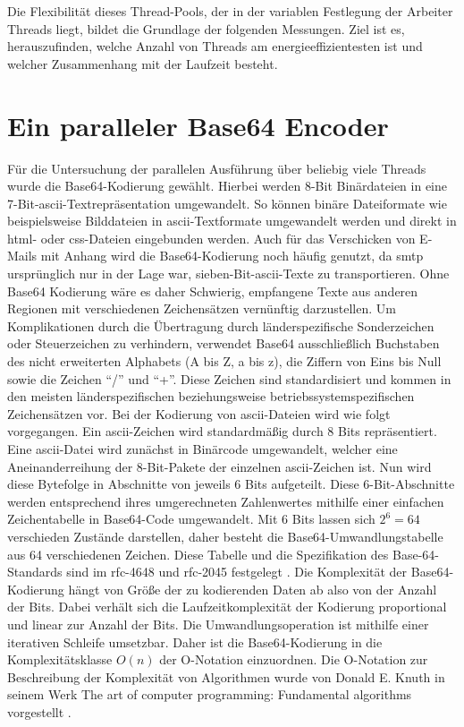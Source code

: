 Die Flexibilität dieses Thread-Pools, der in der variablen Festlegung der Arbeiter Threads liegt, bildet die Grundlage der folgenden Messungen. Ziel ist es, herauszufinden, welche Anzahl von Threads am energieeffizientesten ist und welcher Zusammenhang mit der Laufzeit besteht.

\section{Ein paralleler Base64 Encoder}

Für die Untersuchung der parallelen Ausführung über beliebig viele Threads wurde die Base64-Kodierung gewählt. Hierbei werden 8-Bit Binärdateien in eine 7-Bit-\ac{ascii}-Textrepräsentation umgewandelt. So können binäre Dateiformate wie beispielsweise Bilddateien in \ac{ascii}-Textformate umgewandelt werden und direkt in \ac{html}- oder \ac{css}-Dateien eingebunden werden. Auch für das Verschicken von E-Mails mit Anhang wird die Base64-Kodierung noch häufig genutzt, da \ac{smtp} ursprünglich nur in der Lage war, sieben-Bit-\ac{ascii}-Texte zu transportieren. Ohne Base64 Kodierung wäre es daher Schwierig, empfangene Texte aus anderen Regionen mit verschiedenen Zeichensätzen vernünftig darzustellen. Um Komplikationen durch die Übertragung durch länderspezifische Sonderzeichen oder Steuerzeichen zu verhindern, verwendet Base64 ausschließlich Buchstaben des nicht erweiterten Alphabets (A bis Z, a bis z), die Ziffern von Eins bis Null sowie die Zeichen \enquote{/} und \enquote{+}. Diese Zeichen sind standardisiert und kommen in den meisten länderspezifischen beziehungsweise betriebssystemspezifischen Zeichensätzen vor. Bei der Kodierung von \ac{ascii}-Dateien wird wie folgt vorgegangen. Ein \ac{ascii}-Zeichen wird standardmäßig durch 8 Bits repräsentiert. Eine \ac{ascii}-Datei wird zunächst in Binärcode umgewandelt, welcher eine Aneinanderreihung der 8-Bit-Pakete der einzelnen \ac{ascii}-Zeichen ist. Nun wird diese Bytefolge in Abschnitte von jeweils 6 Bits aufgeteilt. Diese 6-Bit-Abschnitte werden entsprechend ihres umgerechneten Zahlenwertes mithilfe einer einfachen Zeichentabelle in Base64-Code umgewandelt. Mit 6 Bits lassen sich $2^{ 6 } = 64$ verschieden Zustände darstellen, daher besteht die Base64-Umwandlungstabelle aus 64 verschiedenen Zeichen. Diese Tabelle und die Spezifikation des Base-64-Standards sind im \ac{rfc}-4648 \cite{base64-rfc4648} und \ac{rfc}-2045 festgelegt \cite{base64-rfc2045}. Die Komplexität der Base64-Kodierung hängt von Größe der zu kodierenden Daten ab also von der Anzahl der Bits. Dabei verhält sich die Laufzeitkomplexität der Kodierung proportional und linear zur Anzahl der Bits. Die Umwandlungsoperation ist mithilfe einer iterativen Schleife umsetzbar. Daher ist die Base64-Kodierung in die Komplexitätsklasse $O(n)$ der O-Notation einzuordnen. Die O-Notation zur Beschreibung der Komplexität von Algorithmen wurde von Donald E. Knuth in seinem Werk \glqq The art of computer programming: Fundamental algorithms\grqq{} vorgestellt \cite[107]{knuth1} .

